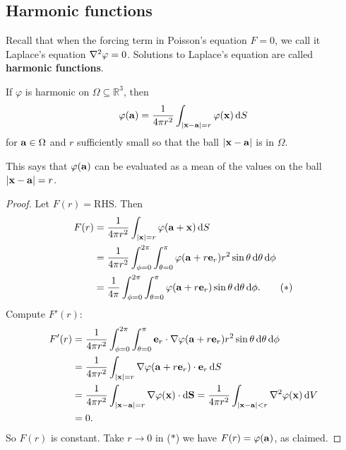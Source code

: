 \subsection{Harmonic functions}
\begin{definition}
    Recall that when the forcing term in Poisson's equation $ F=0 $, we call it Laplace's equation $ \laplacian \varphi=0 $. Solutions to Laplace's equation are called \textbf{harmonic functions}.
\end{definition}
\begin{proposition}
    If $ \varphi $ is harmonic on $ \Omega \subseteq \mathbb{R}^3 $, then 
    \[
        \varphi({\bf a}) = \frac{1}{4\pi r^2} \int_{|{\bf x}-{\bf a}|=r} \varphi({\bf x}) \,\mathrm{d}S
    \]
    for $ {\bf a}\in \Omega $ and $r$ sufficiently small so that the ball $ |{\bf x}-{\bf a}| $ is in $ \Omega $.
\end{proposition}
\begin{note}
    This says that $ \varphi({\bf a}) $ can be evaluated as a mean of the values on the ball $ |{\bf x}-{\bf a}|=r $.
\end{note}
\begin{proof}
    Let $ F(r)=\text{RHS} $. Then 
    \begin{align}
        F(r) &= \frac{1}{4\pi r^2} \int_{|{\bf x}|=r} \varphi({\bf a}+{\bf x}) \,\mathrm{d}S\nonumber\\ \nonumber
        &= \frac{1}{4\pi r^2} \int_{\phi=0}^{2\pi} \int_{\theta=0}^{\pi} \varphi({\bf a}+r{\bf e}_r) r^2 \sin \theta \,\mathrm{d}\theta \,\mathrm{d}\phi\\ 
        &= \frac{1}{4\pi} \int_{\phi=0}^{2\pi} \int_{\theta=0}^{\pi} \varphi({\bf a}+r{\bf e}_r) \sin \theta \,\mathrm{d}\theta \,\mathrm{d}\phi.\tag{$*$}
    \end{align}
    Compute $ F'(r) $: 
    \begin{align*}
        F'(r)&= \frac{1}{4\pi r^2}\int_{\phi=0}^{2\pi} \int_{\theta=0}^{\pi} \bfe_r \cdot \nabla \varphi(\bfa+r\bfe_r) r^2 \sin \theta \,\mathrm{d}\theta \,\mathrm{d}\phi\\ 
        &= \frac{1}{4\pi r^2} \int_{|\bfx|=r} \nabla \varphi(\bfa+r\bfe_r) \cdot \bfe_r \,\mathrm{d}S\\ 
        &= \frac{1}{4\pi r^2} \int_{|\bfx-\bfa|=r} \nabla \varphi(\bfx)  \cdot \mathrm{d}\bfS = \frac{1}{4\pi r^2} \int_{|\bfx-\bfa|<r} \laplacian \varphi(\bfx) \,\mathrm{d}V\\ 
        & =0.
    \end{align*}
    So $F(r)$ is constant. Take $ r\to 0 $ in ($ * $) we have $ F(r)=\varphi({\bf a}) $, as claimed.
\end{proof}

